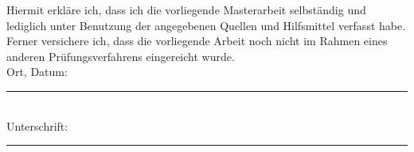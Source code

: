 \documentclass[
11pt, %
english, %
singlespacing, %
headsepline, %
consistentlayout, %
]{MastersDoctoralThesis} %
\begin{document}
\printbibliography[heading=bibintoc]




\begin{declaration}
	\addchaptertocentry{\authorshipname} %

Hiermit erkläre ich, dass ich die vorliegende Masterarbeit selbständig und lediglich unter Benutzung der angegebenen Quellen und Hilfsmittel verfasst habe. Ferner versichere ich, dass die vorliegende Arbeit noch nicht im Rahmen eines anderen Prüfungsverfahrens eingereicht wurde. \\[1cm]
	
	\noindent Ort, Datum:\\
	\rule[0.5em]{25em}{0.5pt} %
	\\[0.5cm]
	\noindent Unterschrift:\\
	\rule[0.5em]{25em}{0.5pt} %
\end{declaration}



\end{document}
